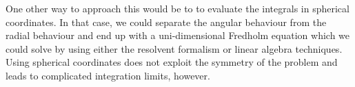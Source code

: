 One other way to approach this would be to to evaluate the integrals in spherical coordinates. In that 
case, we could separate the angular behaviour from the radial behaviour and end up with 
a uni-dimensional Fredholm equation which we could solve by using either the resolvent formalism
or linear algebra techniques. Using spherical coordinates does not exploit the symmetry of the problem
and leads to complicated integration limits, however.